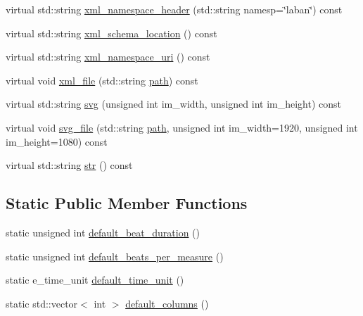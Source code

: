 \begin{DoxyCompactItemize}
\item 
virtual std\-::string \hyperlink{classmae_1_1fl_1_1laban_1_1laban__sequence_ab32609124ebd72fbd02c664b9877122e}{xml\-\_\-namespace\-\_\-header} (std\-::string namesp=\char`\"{}laban\char`\"{}) const 
\item 
virtual std\-::string \hyperlink{classmae_1_1fl_1_1laban_1_1laban__sequence_a59957da4b728a6988a4586f853634260}{xml\-\_\-schema\-\_\-location} () const 
\item 
virtual std\-::string \hyperlink{classmae_1_1fl_1_1laban_1_1laban__sequence_ace16e678e6e867cb724c3bea0b5b735a}{xml\-\_\-namespace\-\_\-uri} () const 
\item 
virtual void \hyperlink{classmae_1_1fl_1_1laban_1_1laban__sequence_a5b05adeb246fa97cbdc2aac2e5a44a95}{xml\-\_\-file} (std\-::string \hyperlink{classmae_1_1fl_1_1laban_1_1path}{path}) const 
\item 
virtual std\-::string \hyperlink{classmae_1_1fl_1_1laban_1_1laban__sequence_a9e446308d6fcd84749abf6b0c06b623f}{svg} (unsigned int im\-\_\-width, unsigned int im\-\_\-height) const 
\item 
virtual void \hyperlink{classmae_1_1fl_1_1laban_1_1laban__sequence_a4b0c1269be59c44b094308e0b1036008}{svg\-\_\-file} (std\-::string \hyperlink{classmae_1_1fl_1_1laban_1_1path}{path}, unsigned int im\-\_\-width=1920, unsigned int im\-\_\-height=1080) const 
\item 
virtual std\-::string \hyperlink{classmae_1_1fl_1_1laban_1_1laban__sequence_a2285fd1243bbc9ac68fb76a5d3576ae5}{str} () const 
\end{DoxyCompactItemize}
\subsection*{Static Public Member Functions}
\begin{DoxyCompactItemize}
\item 
static unsigned int \hyperlink{classmae_1_1fl_1_1laban_1_1laban__sequence_ac7bf04cdac0c3aed6b8ee4a887e561d9}{default\-\_\-beat\-\_\-duration} ()
\item 
static unsigned int \hyperlink{classmae_1_1fl_1_1laban_1_1laban__sequence_a2e64362d5cfeb89eb8545cb064e63170}{default\-\_\-beats\-\_\-per\-\_\-measure} ()
\item 
static e\-\_\-time\-\_\-unit \hyperlink{classmae_1_1fl_1_1laban_1_1laban__sequence_ada28215d43d85e983fe6129e9816eed2}{default\-\_\-time\-\_\-unit} ()
\item 
static std\-::vector$<$ int $>$ \hyperlink{classmae_1_1fl_1_1laban_1_1laban__sequence_adda43b657712484d90b4ef3927a81128}{default\-\_\-columns} ()
\end{DoxyCompactItemize}
